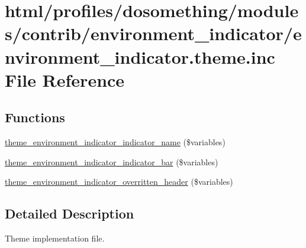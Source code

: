 \hypertarget{environment__indicator_8theme_8inc}{
\section{html/profiles/dosomething/modules/contrib/environment\_\-indicator/environment\_\-indicator.theme.inc File Reference}
\label{environment__indicator_8theme_8inc}
}
\subsection*{Functions}
\begin{DoxyCompactItemize}
\item 
\hyperlink{environment__indicator_8theme_8inc_a7713fb366131ba0d1354507a15b9de82}{theme\_\-environment\_\-indicator\_\-indicator\_\-name} (\$variables)
\item 
\hyperlink{environment__indicator_8theme_8inc_adb7ec0f584c1ff28a051ed312208a39a}{theme\_\-environment\_\-indicator\_\-indicator\_\-bar} (\$variables)
\item 
\hyperlink{environment__indicator_8theme_8inc_a9d4c9d58c5670204b5d584cae5c1cf9c}{theme\_\-environment\_\-indicator\_\-overritten\_\-header} (\$variables)
\end{DoxyCompactItemize}


\subsection{Detailed Description}
Theme implementation file. 

